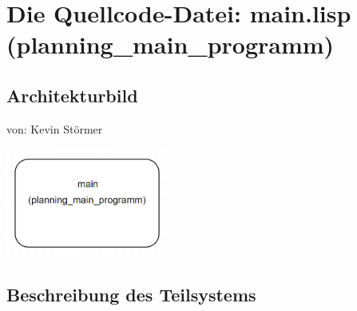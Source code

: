 \documentclass{suturo}
\begin{document}

\makeatletter
\newcommand{\chapterauthor}[1]{%
  {\parindent0pt\vspace*{-27pt}%
  \linespread{0}\small\begin{flushright}von: #1\end{flushright}%
  \par\nobreak\vspace*{0pt}}
  \@afterheading%
}
\makeatother


\section{Die Quellcode-Datei: main.lisp (planning\_main\_programm)}
\subsection{Architekturbild}
\chapterauthor{Kevin Störmer}
\begin{center} \includegraphics[width=0.4\textwidth]{img/diag_planning_main_programm.png} \end{center}
\subsection{Beschreibung des Teilsystems}
\end{document}
